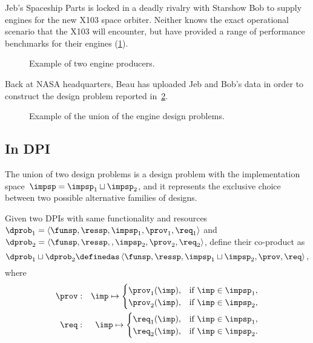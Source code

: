\begin{example}
  Jeb's Spaceship Parts is locked in a deadly rivalry with Starshow Bob to supply engines for the new X103 space orbiter. Neither knows the exact operational scenario that the X103 will encounter, but have provided a range of performance benchmarks for their engines (\cref{fig:exunion_1}).
  \begin{figure}[h!]
    \begin{center}
    \end{center}
    \caption{Example of two engine producers. }
    \label{fig:exunion_1}
  \end{figure}
  Back at NASA headquarters, Beau has uploaded Jeb and Bob's data in order to construct the design problem reported in~\cref{fig:exunion_2}.
  \begin{figure}[h!]
    \begin{center}
    \end{center}
    \caption{Example of the union of the engine design problems. }
    \label{fig:exunion_2}
  \end{figure}
\end{example}

\subsection{In DPI}\label{subsec:dpi-union}


The union of two design problems is a design problem with the implementation
space~$\impsp=\impsp_{1}\sqcup\impsp_{2}$, and it represents the
exclusive choice between two possible alternative families of designs.
\begin{definition}[Coproduct]
  \label{def:parallel-1}Given two DPIs with same functionality and
  resources~$\dprob_{1}=\left\langle \funsp,\ressp,\impsp_{1},\prov_{1},\req_{1}\right\rangle$
  and~$\dprob_{2}=\left\langle \funsp,\ressp,,\impsp_{2},\prov_{2},\req_{2}\right\rangle$,
  define their co-product as
  \begin{equation}
    \dprob_{1}\sqcup\dprob_{2}\definedas\left\langle \funsp,\ressp,\impsp_{1}\sqcup\impsp_{2},\prov,\req\right\rangle ,
  \end{equation}
  where
  \begin{eqnarray}
    \prov & : & \imp\mapsto\begin{cases}
                             \prov_{1}(\imp), & \text{if }\imp\in\impsp_{1},\\
                             \prov_{2}(\imp), & \text{if }\imp\in\impsp_{2},
    \end{cases}\label{eq:dppar-exec-1}\\
    \req & : & \imp\mapsto\begin{cases}
                            \req_{1}(\imp), & \text{if }\imp\in\impsp_{1},\\
                            \req_{2}(\imp), & \text{if }\imp\in\impsp_{2}.
    \end{cases}\nonumber
  \end{eqnarray}
\end{definition}

